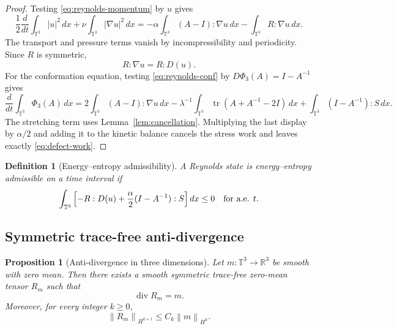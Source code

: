 \documentclass[10pt,a4paper]{amsart}
\numberwithin{equation}{section}
\newtheorem{proposition}[theorem]{Proposition}
\newtheorem{definition}[theorem]{Definition}
\newcommand{\T}{\mathbb T}
\newcommand{\R}{\mathbb R}
\newcommand{\Id}{I}
\newcommand{\tr}{\operatorname{tr}}
\newcommand{\divv}{\operatorname{div}}
\newcommand{\norm}[1]{\left\lVert #1\right\rVert}
\begin{document}
\begin{proof}
Testing \eqref{eq:reynolds-momentum} by \(u\) gives
\[
  \frac12\frac{d}{dt}\int_{\T^3}|u|^2\,dx
  +\nu\int_{\T^3}|\nabla u|^2\,dx
  =
  -\alpha\int_{\T^3}(A-\Id):\nabla u\,dx
  -\int_{\T^3}R:\nabla u\,dx .
\]
The transport and pressure terms vanish by incompressibility and periodicity.
Since \(R\) is symmetric,
\[
  R:\nabla u=R:D(u).
\]
For the conformation equation, testing \eqref{eq:reynolds-conf} by
\(D\Phi_3(A)=\Id-A^{-1}\) gives
\[
  \frac{d}{dt}\int_{\T^3}\Phi_3(A)\,dx
  =
  2\int_{\T^3}(A-\Id):\nabla u\,dx
  -\lambda^{-1}\int_{\T^3}\tr(A+A^{-1}-2\Id)\,dx
  +\int_{\T^3}(\Id-A^{-1}):S\,dx .
\]
The stretching term uses Lemma~\ref{lem:cancellation}.  Multiplying the last
display by \(\alpha/2\) and adding it to the kinetic balance cancels the
stress work and leaves exactly \eqref{eq:defect-work}.
\end{proof}

\begin{definition}[Energy--entropy admissibility]
A Reynolds state is energy--entropy admissible on a time interval if
\begin{equation}
  \int_{\T^3}
  \left[
  -R:D(u)+\frac{\alpha}{2}(\Id-A^{-1}):S
  \right]dx
  \le0
  \quad\hbox{for a.e. }t.
  \label{eq:admissibility}
\end{equation}
\end{definition}

\subsection{Symmetric trace-free anti-divergence}

\begin{proposition}[Anti-divergence in three dimensions]
\label{prop:antidiv}
Let \(m:\T^3\to\R^3\) be smooth with zero mean.  Then there exists a smooth
symmetric trace-free zero-mean tensor \(R_m\) such that
\[
  \divv R_m=m.
\]
Moreover, for every integer \(k\ge0\),
\[
  \norm{R_m}_{H^{k+1}}\le C_k\norm{m}_{H^k}.
\]
\end{proposition}
\end{document}
